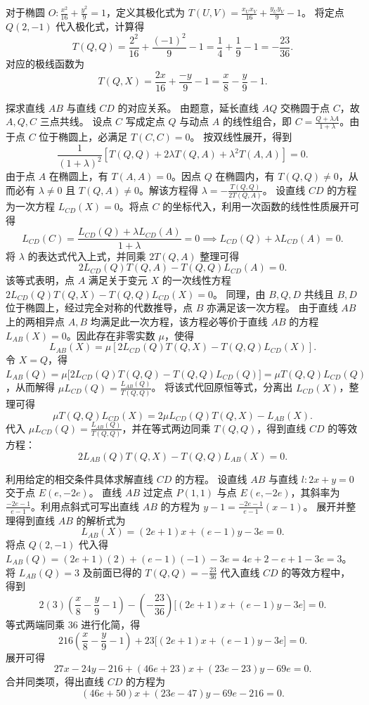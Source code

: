 \begin{solution}
对于椭圆 $O: \frac{x^2}{16} + \frac{y^2}{9} = 1$，定义其极化式为 $T(U, V) = \frac{x_U x_V}{16} + \frac{y_U y_V}{9} - 1$。
将定点 $Q(2,-1)$ 代入极化式，计算得
\[ T(Q, Q) = \frac{2^2}{16} + \frac{(-1)^2}{9} - 1 = \frac{1}{4} + \frac{1}{9} - 1 = -\frac{23}{36}. \]
对应的极线函数为 
\[ T(Q, X) = \frac{2x}{16} + \frac{-y}{9} - 1 = \frac{x}{8} - \frac{y}{9} - 1. \]

探求直线 $AB$ 与直线 $CD$ 的对应关系。
由题意，延长直线 $AQ$ 交椭圆于点 $C$，故 $A, Q, C$ 三点共线。
设点 $C$ 写成定点 $Q$ 与动点 $A$ 的线性组合，即 $C = \frac{Q + \lambda A}{1+\lambda}$。由于点 $C$ 位于椭圆上，必满足 $T(C, C) = 0$。
按双线性展开，得到
\[ \frac{1}{(1+\lambda)^2} \left[ T(Q, Q) + 2\lambda T(Q, A) + \lambda^2 T(A, A) \right] = 0. \]
由于点 $A$ 在椭圆上，有 $T(A, A) = 0$。因点 $Q$ 在椭圆内，有 $T(Q, Q) \neq 0$，从而必有 $\lambda \neq 0$ 且 $T(Q, A) \neq 0$。解该方程得 $\lambda = -\frac{T(Q, Q)}{2T(Q, A)}$。
设直线 $CD$ 的方程为一次方程 $L_{CD}(X) = 0$。将点 $C$ 的坐标代入，利用一次函数的线性性质展开可得
\[ L_{CD}(C) = \frac{L_{CD}(Q) + \lambda L_{CD}(A)}{1+\lambda} = 0 \implies L_{CD}(Q) + \lambda L_{CD}(A) = 0. \]
将 $\lambda$ 的表达式代入上式，并同乘 $2T(Q, A)$ 整理可得
\[ 2L_{CD}(Q)T(Q, A) - T(Q, Q)L_{CD}(A) = 0. \]
该等式表明，点 $A$ 满足关于变元 $X$ 的一次线性方程 $2L_{CD}(Q)T(Q, X) - T(Q, Q)L_{CD}(X) = 0$。
同理，由 $B, Q, D$ 共线且 $B, D$ 位于椭圆上，经过完全对称的代数推导，点 $B$ 亦满足该一次方程。
由于直线 $AB$ 上的两相异点 $A, B$ 均满足此一次方程，该方程必等价于直线 $AB$ 的方程 $L_{AB}(X) = 0$。因此存在非零实数 $\mu$，使得
\[ L_{AB}(X) = \mu \left[ 2L_{CD}(Q)T(Q, X) - T(Q, Q)L_{CD}(X) \right]. \]
令 $X = Q$，得 $L_{AB}(Q) = \mu \big[ 2L_{CD}(Q)T(Q, Q) - T(Q, Q)L_{CD}(Q) \big] = \mu T(Q, Q)L_{CD}(Q)$，从而解得 $\mu L_{CD}(Q) = \frac{L_{AB}(Q)}{T(Q, Q)}$。
将该式代回原恒等式，分离出 $L_{CD}(X)$，整理可得
\[ \mu T(Q, Q)L_{CD}(X) = 2\mu L_{CD}(Q)T(Q, X) - L_{AB}(X). \]
代入 $\mu L_{CD}(Q) = \frac{L_{AB}(Q)}{T(Q, Q)}$，并在等式两边同乘 $T(Q, Q)$，得到直线 $CD$ 的等效方程：
\[ 2L_{AB}(Q)T(Q, X) - T(Q, Q)L_{AB}(X) = 0. \]

利用给定的相交条件具体求解直线 $CD$ 的方程。
设直线 $AB$ 与直线 $l: 2x+y=0$ 交于点 $E(e, -2e)$。
直线 $AB$ 过定点 $P(1,1)$ 与点 $E(e, -2e)$，其斜率为 $\frac{-2e - 1}{e - 1}$。利用点斜式可写出直线 $AB$ 的方程为 $y - 1 = \frac{-2e - 1}{e - 1} (x - 1)$。
展开并整理得到直线 $AB$ 的解析式为
\[ L_{AB}(X) = (2e+1)x + (e-1)y - 3e = 0. \]
将点 $Q(2,-1)$ 代入得 $L_{AB}(Q) = (2e+1)(2) + (e-1)(-1) - 3e = 4e + 2 - e + 1 - 3e = 3$。
将 $L_{AB}(Q) = 3$ 及前面已得的 $T(Q, Q) = -\frac{23}{36}$ 代入直线 $CD$ 的等效方程中，得到
\[ 2(3)\left(\frac{x}{8} - \frac{y}{9} - 1\right) - \left(-\frac{23}{36}\right) \big[ (2e+1)x + (e-1)y - 3e \big] = 0. \]
等式两端同乘 $36$ 进行化简，得
\[ 216\left(\frac{x}{8} - \frac{y}{9} - 1\right) + 23\big[ (2e+1)x + (e-1)y - 3e \big] = 0. \]
展开可得
\[ 27x - 24y - 216 + (46e+23)x + (23e-23)y - 69e = 0. \]
合并同类项，得出直线 $CD$ 的方程为
\[ (46e + 50)x + (23e - 47)y - 69e - 216 = 0. \]


\end{solution}
